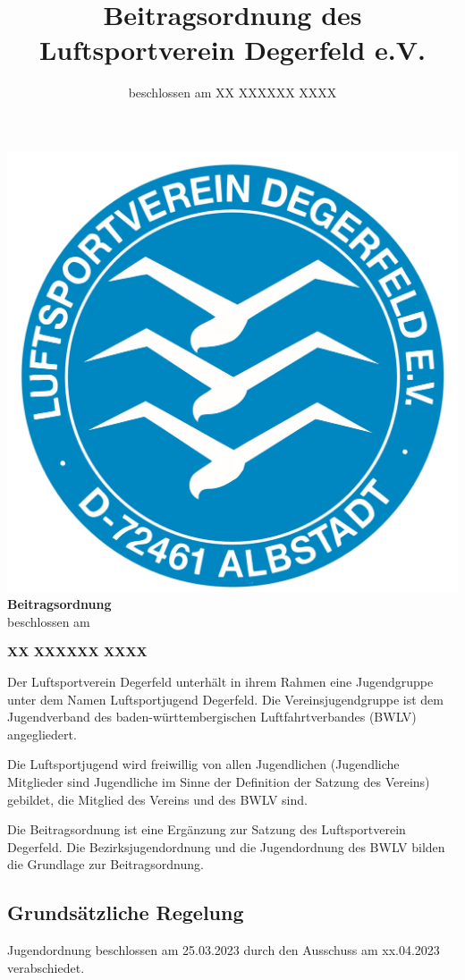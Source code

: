 \documentclass[10pt,a4paper,parskip=half]{scrartcl}
\title{Beitragsordnung des Luftsportverein Degerfeld e.V.}
\subtitle{beschlossen am XX XXXXXX XXXX}
\begin{document}
\thispagestyle{plain}
\begin{center}
  \includegraphics[scale=0.2]{../Logo.png}\\[5ex]
  
  \Huge{\textbf{Beitragsordnung}}\\[1.5ex]
  \large{beschlossen am}\\[1.5ex]
  
  \normalsize
  
  \textbf{\Large{XX XXXXXX XXXX}}\\
  
\end{center}

\begin{contract}
    
    Der Luftsportverein Degerfeld unterhält in ihrem Rahmen eine Jugendgruppe unter dem Namen Luftsportjugend Degerfeld. Die Vereinsjugendgruppe ist dem Jugendverband des baden-württembergischen Luftfahrtverbandes (BWLV) angegliedert.
    
    Die Luftsportjugend wird freiwillig von allen Jugendlichen (Jugendliche Mitglieder sind Jugendliche im Sinne der Definition der Satzung des Vereins) gebildet, die Mitglied des Vereins und des BWLV sind.
    
    Die Beitragsordnung ist eine Ergänzung zur Satzung des Luftsportverein Degerfeld. Die Bezirksjugendordnung und die Jugendordnung des BWLV bilden die Grundlage zur Beitragsordnung.

    \subsection*{Grundsätzliche Regelung}


\end{contract}
Jugendordnung beschlossen am 25.03.2023 durch den Ausschuss am xx.04.2023 verabschiedet.
\end{document}
